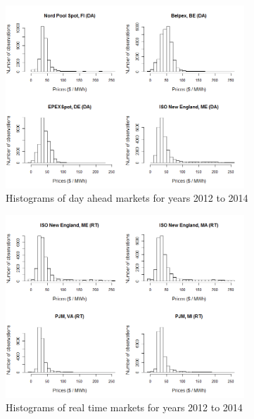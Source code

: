\begin{figure}[htbp]
	\centering
		\includegraphics[width=0.8\textwidth]{figures/data_analysis/Histograms_da_2012_2014.png}
	\caption{Histograms of day ahead markets for years 2012 to 2014}
	\label{fig:Histograms_da_2012_2014}
\end{figure}

\begin{figure}[htbp]
	\centering
		\includegraphics[width=0.8\textwidth]{figures/data_analysis/Histograms_rt_2012_2014.png}
	\caption{Histograms of real time markets for years 2012 to 2014}
	\label{fig:Histograms_rt_2012_2014}
\end{figure}




